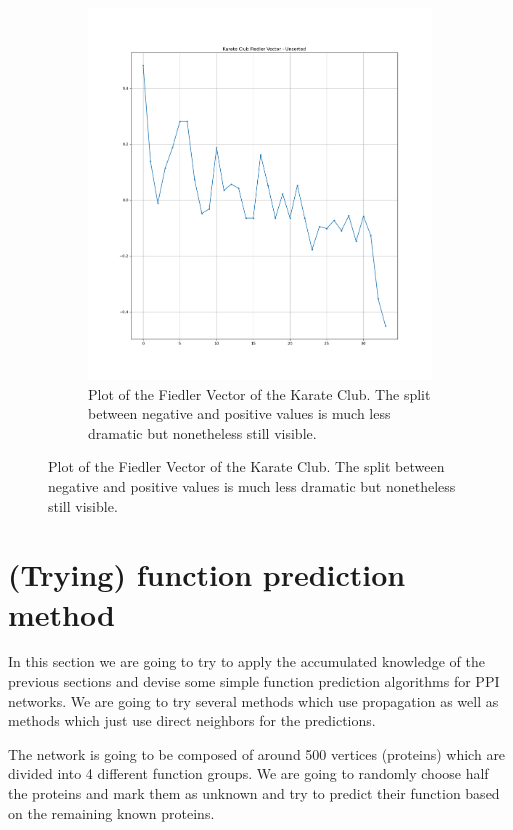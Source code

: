 \documentclass[a4paper,10pt]{article}
\theoremstyle{definition}
\theoremstyle{remark}
\theoremstyle{plain}
\begin{document}
\begin{figure}
\begin{framed}
\begin{subfigure}[b]{0.5\textwidth}
\includegraphics[width=\textwidth]{karate_fiedler_unsorted.png}
\caption{Plot of the Fiedler Vector of the Karate Club. The split between
negative and positive values is much less dramatic but nonetheless still visible.}
\label{fig:karatefiedlerplot}
\end{subfigure}
\end{framed}
\end{figure}

\section{(Trying) function prediction method}
In this section we are going to try to apply the accumulated knowledge of the
previous sections and devise some simple function prediction algorithms for PPI
networks. We are going to try several methods which use propagation as well as
methods which just use direct neighbors for the predictions.

The network is going to be composed of around 500 vertices (proteins) which are
divided into 4 different function groups. We are going to randomly choose half
the proteins and mark them as unknown and try to predict their function based
on the remaining known proteins. 
\end{document}
